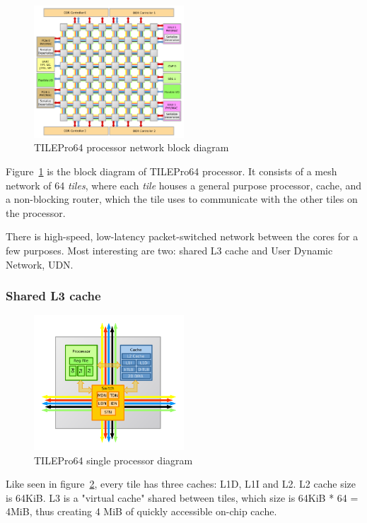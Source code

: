 \documentclass[english,11pt]{l4proj}
\begin{document}
\begin{figure}
    \centering
    \includegraphics[width=0.5\textwidth]{images/tile64.pdf}
    \caption{TILEPro64 processor network block diagram\cite{tilepro64-diagram}}
    \label{fig:tile64}
\end{figure}

Figure~\ref{fig:tile64} is the block diagram of TILEPro64 processor. It consists
of a mesh network of 64 {\em tiles}, where each {\em tile} houses a general
purpose processor, cache, and a non-blocking router, which the tile uses to
communicate with the other tiles on the processor.

There is high-speed, low-latency packet-switched network between the cores for a
few purposes. Most interesting are two: shared L3 cache and User Dynamic
Network, UDN.

\subsubsection{Shared L3 cache}
\begin{figure}
    \centering
    \includegraphics[width=0.5\textwidth]{images/tile64_cpu.pdf}
    \caption{TILEPro64 single processor diagram\cite{tilepro64-diagram}}
    \label{fig:tile64_cpu}
\end{figure}

Like seen in figure~\ref{fig:tile64_cpu}, every tile has three caches: L1D, L1I
and L2. L2 cache size is 64KiB. L3 is a "virtual cache" shared between tiles,
which size is 64KiB * 64 = 4MiB, thus creating 4 MiB of quickly accessible
on-chip cache.
\end{document}
